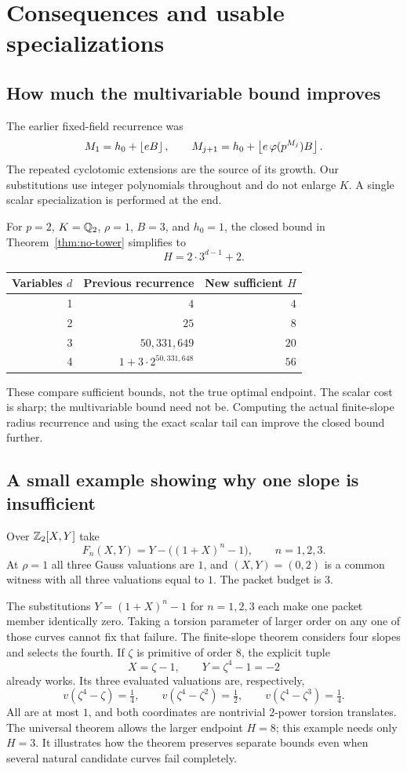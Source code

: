 \section{Consequences and usable specializations}
\label{sec:applications}

\subsection{How much the multivariable bound improves}
The earlier fixed-field recurrence was
\[
 M_1=h_0+\left\lfloor eB\right\rfloor,\qquad
 M_{j+1}=h_0+\left\lfloor e\,\varphi(p^{M_j})B\right\rfloor.
\]
The repeated cyclotomic extensions are the source of its growth. Our substitutions use integer polynomials throughout and do not enlarge $K$. A single scalar specialization is performed at the end.

For $p=2$, $K=\mathbb Q_2$, $\rho=1$, $B=3$, and $h_0=1$, the closed bound in Theorem~\ref{thm:no-tower} simplifies to
\[
 H=2\cdot3^{d-1}+2.
\]
\begin{center}
\begin{tabular}{@{}rrr@{}}
\toprule
Variables $d$ & Previous recurrence & New sufficient $H$\\
\midrule
1 & $4$ & $4$\\
2 & $25$ & $8$\\
3 & $50{,}331{,}649$ & $20$\\
4 & $1+3\cdot2^{50{,}331{,}648}$ & $56$\\
\bottomrule
\end{tabular}
\end{center}
These compare sufficient bounds, not the true optimal endpoint. The scalar cost is sharp; the multivariable bound need not be. Computing the actual finite-slope radius recurrence and using the exact scalar tail can improve the closed bound further.

\subsection{A small example showing why one slope is insufficient}
Over $\mathbb Z_2[X,Y]$ take
\[
 F_n(X,Y)=Y-\big((1+X)^n-1\big),\qquad n=1,2,3.
\]
At $\rho=1$ all three Gauss valuations are $1$, and $(X,Y)=(0,2)$ is a common witness with all three valuations equal to $1$. The packet budget is $3$.

The substitutions $Y=(1+X)^n-1$ for $n=1,2,3$ each make one packet member identically zero. Taking a torsion parameter of larger order on any one of those curves cannot fix that failure. The finite-slope theorem considers four slopes and selects the fourth. If $\zeta$ is primitive of order $8$, the explicit tuple
\[
 X=\zeta-1,\qquad Y=\zeta^4-1=-2
\]
already works. Its three evaluated valuations are, respectively,
\[
 v(\zeta^4-\zeta)=\tfrac14,\qquad
 v(\zeta^4-\zeta^2)=\tfrac12,\qquad
 v(\zeta^4-\zeta^3)=\tfrac14.
\]
All are at most $1$, and both coordinates are nontrivial $2$-power torsion translates. The universal theorem allows the larger endpoint $H=8$; this example needs only $H=3$. It illustrates how the theorem preserves separate bounds even when several natural candidate curves fail completely.

